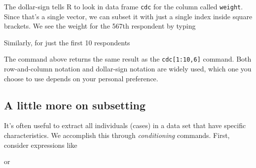 \documentclass[]{article}
\newenvironment{Shaded}{\begin{snugshade}}{\end{snugshade}}
\newcommand{\DecValTok}[1]{\textcolor[rgb]{0.00,0.00,0.81}{{#1}}}
\newcommand{\StringTok}[1]{\textcolor[rgb]{0.31,0.60,0.02}{{#1}}}
\newcommand{\NormalTok}[1]{{#1}}
\begin{document}
\begin{Shaded}
\end{Shaded}

The dollar-sign tells R to look in data frame \texttt{cdc} for the
column called \texttt{weight}. Since that's a single vector, we can
subset it with just a single index inside square brackets. We see the
weight for the 567th respondent by typing

\begin{Shaded}
\end{Shaded}

Similarly, for just the first 10 respondents

\begin{Shaded}
\end{Shaded}

The command above returns the same result as the
\texttt{cdc{[}1:10,6{]}} command. Both row-and-column notation and
dollar-sign notation are widely used, which one you choose to use
depends on your personal preference.

\subsection{A little more on
subsetting}\label{a-little-more-on-subsetting}

It's often useful to extract all individuals (cases) in a data set that
have specific characteristics. We accomplish this through
\emph{conditioning} commands. First, consider expressions like

\begin{Shaded}
\end{Shaded}

or

\begin{Shaded}
\end{Shaded}
\end{document}
